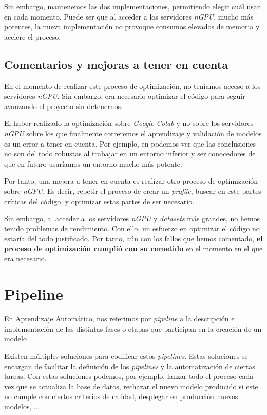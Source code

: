 Sin embargo, mantenemos las dos implementaciones, permitiendo elegir cuál usar en cada momento. Puede ser que al acceder a los servidores \textit{nGPU}, mucho más potentes, la nueva implementación no provoque consumos elevados de memoria y acelere el proceso.

\subsection{Comentarios y mejoras a tener en cuenta}

En el momento de realizar este proceso de optimización, no teníamos acceso a los servidores \textit{nGPU}. Sin embargo, era necesario optimizar el código para seguir avanzando el proyecto sin detenernos.

El haber realizado la optimización sobre \textit{Google Colab} y no sobre los servidores \textit{nGPU} sobre los que finalmente correremos el aprendizaje y validación de modelos es un error a tener en cuenta. Por ejemplo, en  podemos ver que las conclusiones no son del todo robustas al trabajar en un entorno inferior y ser conocedores de que en futuro usaríamos un entorno mucho más potente.

Por tanto, una mejora a tener en cuenta es realizar otro proceso de optimización sobre \textit{nGPU}. Es decir, repetir el proceso de crear un \textit{profile}, buscar en este partes críticas del código, y optimizar estas partes de ser necesario.

Sin embargo, al acceder a los servidores \textit{nGPU} y \textit{datasets} más grandes, no hemos tenido problemas de rendimiento. Con ello, un esfuerzo en optimizar el código no estaría del todo justificado. Por tanto, aún con los fallos que hemos comentado, \textbf{el proceso de optimización cumplió con su cometido} en el momento en el que era necesario.

\section{Pipeline} \label{isec:pipeline}

En Aprendizaje Automático, nos referimos por \textit{pipeline} a la descripción e implementación de las distintas fases o etapas que participan en la creación de un modelo \cite{informatica:pipeline_web}.

Existen múltiples soluciones para codificar estos \textit{pipelines}. Estas soluciones se encargan de facilitar la definición de los \textit{pipelines} y la automatización de ciertas tareas. Con estas soluciones podemos, por ejemplo, lanzar todo el proceso cada vez que se actualiza la base de datos, rechazar el nuevo modelo producido si este no cumple con ciertos criterios de calidad, desplegar en producción nuevos modelos, ...

